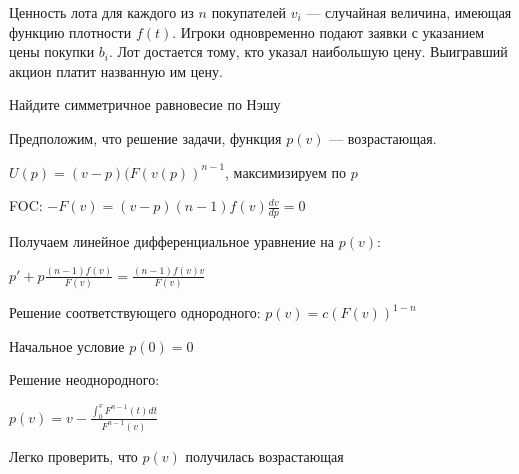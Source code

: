 \begin{problem}
Ценность лота для каждого из $n$ покупателей  $v_{i} $  --- случайная величина, имеющая функцию плотности $f(t)$. Игроки одновременно подают заявки с указанием цены покупки  $b_{i}$. Лот достается тому, кто указал наибольшую цену. Выигравший акцион платит названную им цену. \par
Найдите симметричное равновесие по Нэшу



\begin{sol}

Предположим, что решение задачи, функция $p(v)$ --- возрастающая. \par
$U(p)=(v-p)(F(v(p))^{n-1}$, максимизируем по $p$ \par
FOC: $-F(v)=(v-p)(n-1)f(v)\frac{dv}{dp}=0$ \par
Получаем линейное дифференциальное уравнение на $p(v)$: \par
$p'+p\frac{(n-1)f(v)}{F(v)}=\frac{(n-1)f(v)v}{F(v)}$ \par
Решение соответствующего однородного: $p(v)=c(F(v))^{1-n}$ \par
Начальное условие $p(0)=0$ \par
Решение неоднородного: \par
$p(v)=v-\frac{\int_{0}^{v}F^{n-1}(t)dt}{F^{n-1}(v)}$ \par
Легко проверить, что $p(v)$ получилась возрастающая
\end{sol}
\end{problem}



